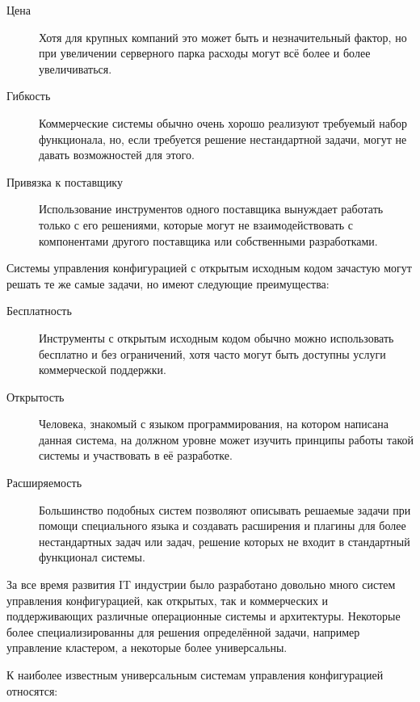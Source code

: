\begin{description}
\item[Цена] Хотя для крупных компаний это может быть и незначительный фактор, но при увеличении серверного парка расходы могут всё более и более увеличиваться.
\item[Гибкость] Коммерческие системы обычно очень хорошо реализуют требуемый набор функционала, но, если требуется решение нестандартной задачи, могут не давать возможностей для этого.
\item[Привязка к поставщику] Использование инструментов одного поставщика вынуждает работать только с его решениями, которые могут не взаимодействовать с компонентами другого поставщика или собственными разработками.
\end{description}

	Системы управления конфигурацией с открытым исходным кодом зачастую могут решать те же самые задачи, но имеют следующие преимущества:
\begin{description}
\item[Бесплатность] Инструменты с открытым исходным кодом обычно можно использовать бесплатно и без ограничений, хотя часто могут быть доступны услуги коммерческой поддержки.
\item[Открытость] Человека, знакомый с языком программирования, на котором написана данная система, на должном уровне может изучить принципы работы такой системы и участвовать в её разработке.
\item[Расширяемость] Большинство подобных систем позволяют описывать решаемые задачи при помощи специального языка и создавать расширения и плагины для более нестандартных задач или задач, решение которых не входит в стандартный функционал системы.
\end{description}

	За все время развития IT индустрии было разработано довольно много систем управления конфигурацией, как открытых, так и коммерческих и поддерживающих различные операционные системы и архитектуры. Некоторые более специализированны для решения определённой задачи, например управление кластером, а некоторые более универсальны.

	К наиболее известным универсальным системам управления конфигурацией относятся:

